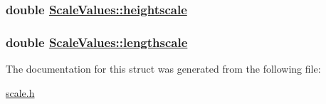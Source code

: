 \hypertarget{structScaleValues_o1}{
\subsubsection[heightscale]{\setlength{\rightskip}{0pt plus 5cm}double \hyperlink{structScaleValues_o1}{Scale\-Values::heightscale}}}
\label{structScaleValues_o1}


\hypertarget{structScaleValues_o0}{
\subsubsection[lengthscale]{\setlength{\rightskip}{0pt plus 5cm}double \hyperlink{structScaleValues_o0}{Scale\-Values::lengthscale}}}
\label{structScaleValues_o0}




The documentation for this struct was generated from the following file:\begin{CompactItemize}
\item 
\hyperlink{scale_8h}{scale.h}\end{CompactItemize}
